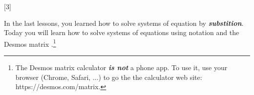 



\renewcommand{\thechapter}{4} 
\renewcommand{\myCurrentChapterTitle}{Systems of Equations}

[3]

\begin{myObjectives}
\end{myObjectives}

\begin{myVocabulary}
\end{myVocabulary}

In the last lessons,
you learned how to solve systems of equation by {\bfseries\itshape substition}.
Today you will learn how to solve systems of equations using  
notation and the Desmos matrix .\footnote{
    The Desmos matrix calculator {\bfseries\itshape is not} a phone app.
    To use it, use your browser (Chrome, Safari, ...) to go the the calculator
    web site: {\ttfamily https://desmos.com/matrix}.
}

